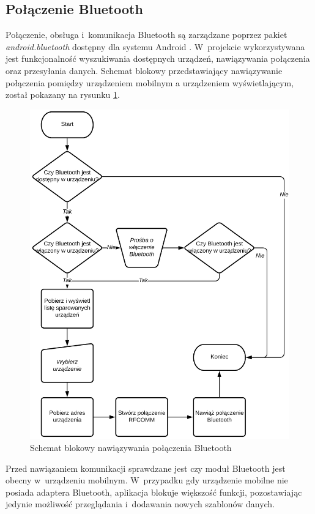\documentclass[a4paper,12pt, twoside]{article}
\begin{document}
    	\subsection{Połączenie Bluetooth}
    	Połączenie, obsługa i~komunikacja Bluetooth są zarządzane poprzez pakiet \textit{android.bluetooth} dostępny dla systemu Android \cite{android.bluetooth}. W~projekcie wykorzystywana jest funkcjonalność wyszukiwania dostępnych urządzeń, nawiązywania połączenia oraz przesyłania danych. Schemat blokowy przedstawiający nawiązywanie połączenia pomiędzy urządzeniem mobilnym a urządzeniem wyświetlającym, został pokazany na rysunku \ref{fig:btconnect}. 
    	\begin{figure}[H]
    	        \centering
    			\includegraphics[width=12cm]{images/rys_12bluetoothconnection.png}
    			\caption{Schemat blokowy nawiązywania połączenia Bluetooth}
                \label{fig:btconnect}
    	\end{figure}
    	Przed nawiązaniem komunikacji sprawdzane jest czy moduł Bluetooth jest obecny w~urządzeniu mobilnym. W~przypadku gdy urządzenie mobilne nie posiada adaptera Bluetooth, aplikacja blokuje większość funkcji, pozostawiając jedynie możliwość przeglądania i~dodawania nowych szablonów danych. 
    	
\end{document}
